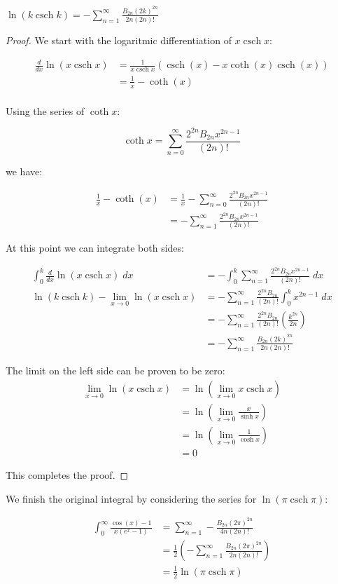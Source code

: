 \documentclass{letter}
\DeclareMathOperator{\csch}{csch}
\begin{document}
\begin{letter}{}
\begin{lemma}
$\ln(k \csch k) = 
   -\sum_{n=1}^\infty\frac{B_{2n}(2k)^{2n}}{2n(2n)!}$
\end{lemma}
\begin{proof}
We start with the logaritmic differentiation of $x \csch x$:

\begin{align*}
  \frac{d}{dx}\ln(x \csch x) &=
    \frac{1}{x \csch x}\left(\csch(x)- x\coth(x)\csch(x)\right)\\
    &= \frac{1}{x}-\coth(x)\\
\end{align*}

Using the series of $\coth x$:

$$\coth x=\sum_{n=0}^\infty\frac{2^{2n}B_{2n}x^{2n-1}}{(2n)!}$$

we have:

\begin{align*}
  \frac{1}{x}-\coth(x) &= \frac{1}{x} - 
    \sum_{n=0}^\infty\frac{2^{2n}B_{2n}x^{2n-1}}{(2n)!}\\
  &= -\sum_{n=1}^\infty\frac{2^{2n}B_{2n}x^{2n-1}}{(2n)!}
\end{align*}

At this point we can integrate both sides:

\begin{align*}
  \int_0^k\frac{d}{dx}\ln(x \csch x)\;dx 
    &= -\int_0^k\sum_{n=1}^\infty\frac{2^{2n}B_{2n}x^{2n-1}}{(2n)!}\;dx\\
  \ln(k \csch k) - \lim_{x\to 0}\ln(x \csch x) 
    &= -\sum_{n=1}^\infty\frac{2^{2n}B_{2n}}{(2n)!}\int_0^k x^{2n-1}\;dx\\
    &= -\sum_{n=1}^\infty\frac{2^{2n}B_{2n}}{(2n)!}
      \left(\frac{k^{2n}}{2n}\right)\\
    &= -\sum_{n=1}^\infty\frac{B_{2n}(2k)^{2n}}{2n(2n)!}
\end{align*}

The limit on the left side can be proven to be zero:
\begin{align*}
  \lim_{x\to 0}\ln(x \csch x) &=
    \ln\left(\lim_{x\to 0}x \csch x\right) \\
  &= \ln\left(\lim_{x\to 0}\frac{x}{\sinh x}\right) \\
  &= \ln\left(\lim_{x\to 0}\frac{1}{\cosh x}\right) \\
  &= 0
\end{align*}

This completes the proof.

\end{proof}

We finish the original integral by considering the series for $\ln(\pi \csch \pi)$:

\begin{align*}
  \int_0^\infty\frac{\cos\left(x\right)-1}{x\left(e^x-1\right)}
  &= \sum_{n=1}^\infty-\frac{B_{2n}(2\pi)^{2n}}{4n(2n)!} \\
  &= \frac{1}{2}\left(-\sum_{n=1}^\infty\frac{B_{2n}(2\pi)^{2n}}{2n(2n)!} 
  \right)\\
  &= \frac{1}{2}\ln(\pi \csch \pi)
\end{align*}



\end{letter}
\end{document}
